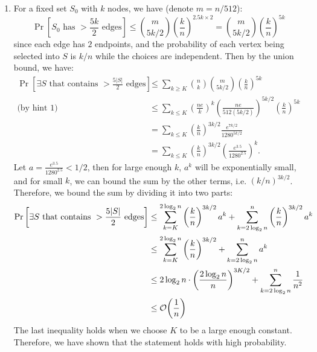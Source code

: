 \begin{answer}
    \begin{enumerate}[label=\alph*).]
        \item For a fixed set $S_0$ with $k$ nodes, we have (denote $m = n / 512$):  
        \begin{equation*}
            \Pr\left[S_0 \text{ has } > \frac{5k}{2} \text{ edges}\right] \le \binom{m}{5k/2} \left(\frac{k}{n}\right)^{2.5k \times 2} = \binom{m}{5k/2} \left(\frac{k}{n}\right)^{5k}
        \end{equation*}
        since each edge has $2$ endpoints, and the probability of each vertex being selected into $S$ is $k / n$ while the choices are independent. Then by the union bound, we have:
        \begin{align*}
            \Pr\left[\exists \text{$S$ that contains } > \frac{5|S|}{2} \text{ edges}\right] &\le \sum_{k \ge K} \binom{n}{k} \binom{m}{5k/2} \left(\frac{k}{n}\right)^{5k}  \\
            \text{(by hint 1) }&\le \sum_{k\le K} \left(\frac{ne}{k}\right)^k \left(\frac{ne}{512(5k/2)}\right)^{5k/2} \left(\frac{k}{n}\right)^{5k} \\
            &= \sum_{k \le K} \left(\frac{k}{n}\right)^{3k/2} \frac{e^{7k/2}}{1280^{5k/2}} \\
            &= \sum_{k \le K} \left(\frac{k}{n}\right)^{3k/2} \left(\frac{e^{3.5}}{1280^{2.5}}\right)^k.
        \end{align*}
        Let $ a = \frac{e^{3.5}}{1280^{2.5}} < 1/2$, then for large enough $k$, $a^k$ will be exponentially small, and for small $k$, we can bound the sum by the other terms, i.e. $(k/n)^{3k/2}$.  Therefore, we bound the sum by dividing it into two parts:
        \begin{align*}
            \Pr\left[\exists \text{$S$ that contains } > \frac{5|S|}{2} \text{ edges}\right] &\le \sum_{k = K}^{2\log_2 n} \left(\frac{k}{n}\right)^{3k/2} a^k + \sum_{k = 2\log_2 n}^{n} \left(\frac{k}{n}\right)^{3k/2} a^k \\
            &\le \sum_{k = K}^{2\log_2 n} \left(\frac{k}{n}\right)^{3k/2} + \sum_{k = 2\log_2 n}^{n} a^k \\
            &\le 2\log_2 n \cdot \left(\frac{2\log_2 n}{n}\right)^{3K/2} + \sum_{k = 2\log_2 n}^{n} \frac{1}{n^2} \\
            &\le \order{\frac{1}{n}}
        \end{align*}
        The last inequality holds when we choose $K$ to be a large enough constant. Therefore, we have shown that the statement holds with high probability.

\end{enumerate}
\end{answer}
